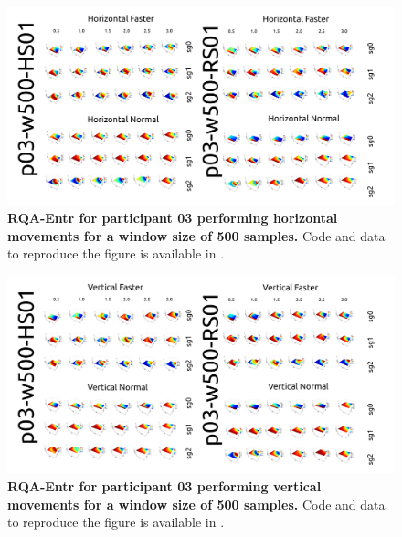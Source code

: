 \documentclass[12pt]{article}
\begin{document}
\newpage
\begin{figure}[ht!]
\centering
\includegraphics{figures/rqa/output/epsilons/rqa-epsilonsp03w500Horizontal}
    	\caption{
	{\bf RQA-Entr for participant 03 performing horizontal movements for a window size of 500 samples.}
	Code and data to reproduce the figure is available in \cite{srep2020}.
        }
    \label{fig-p03-H-w500}
\end{figure}
\begin{figure}[hb!]
\centering
\includegraphics{figures/rqa/output/epsilons/rqa-epsilonsp03w500Vertical}
    	\caption{
	{\bf RQA-Entr for participant 03 performing vertical movements for a window size of 500 samples.}
	Code and data to reproduce the figure is available in \cite{srep2020}.
        }
    \label{fig-p03-V-w500}
\end{figure}
\end{document}
